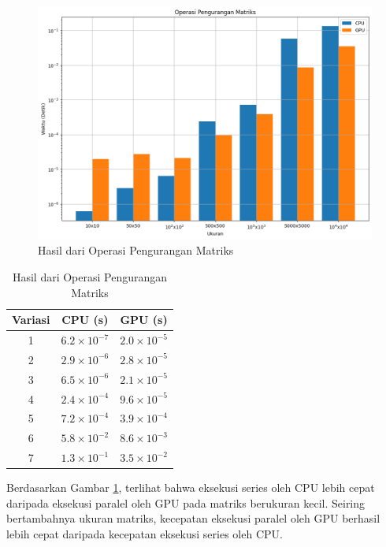 \begin{figure}[H]
	\centering
	\includegraphics[width=14cm, scale=1]{images/penelitian/substraction.png}
	\caption{Hasil dari Operasi Pengurangan Matriks}
	\label{img:result_substraction}
\end{figure}

\begin{table}[H]
	\centering
	\caption{Hasil dari Operasi Pengurangan Matriks}
	\label{tab:result_substraction}
	\begin{tabular}{ccc}
		\toprule
		Variasi & CPU (s)              & GPU (s)              \\
		\midrule
		1       & $6.2 \times 10^{-7}$ & $2.0 \times 10^{-5}$ \\
		2       & $2.9 \times 10^{-6}$ & $2.8 \times 10^{-5}$ \\
		3       & $6.5 \times 10^{-6}$ & $2.1 \times 10^{-5}$ \\
		4       & $2.4 \times 10^{-4}$ & $9.6 \times 10^{-5}$ \\
		5       & $7.2 \times 10^{-4}$ & $3.9 \times 10^{-4}$ \\
		6       & $5.8 \times 10^{-2}$ & $8.6 \times 10^{-3}$ \\
		7       & $1.3 \times 10^{-1}$ & $3.5 \times 10^{-2}$ \\
		\bottomrule
	\end{tabular}
\end{table}

Berdasarkan Gambar \ref{img:result_substraction}, terlihat bahwa eksekusi series oleh CPU lebih cepat daripada eksekusi paralel oleh GPU pada matriks berukuran kecil. Seiring bertambahnya ukuran matriks, kecepatan eksekusi paralel oleh GPU berhasil lebih cepat daripada kecepatan eksekusi series oleh CPU.


